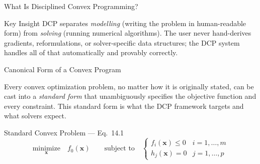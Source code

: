 \documentclass[aspectratio=169,10pt]{beamer}
\begin{document}
\begin{frame}[allowframebreaks]{What Is Disciplined Convex Programming?}
  \begin{alertblock}{Key Insight}
    DCP separates \emph{modelling} (writing the problem in human-readable
    form) from \emph{solving} (running numerical algorithms).  The user
    never hand-derives gradients, reformulations, or solver-specific
    data structures; the DCP system handles all of that automatically and
    provably correctly.
  \end{alertblock}

\end{frame}

\begin{frame}[allowframebreaks]{Canonical Form of a Convex Program}

  Every convex optimization problem, no matter how it is originally
  stated, can be cast into a \emph{standard form} that unambiguously
  specifies the objective function and every constraint.  This standard
  form is what the DCP framework targets and what solvers expect.

  \begin{block}{Standard Convex Problem --- Eq.\ 14.1}
    \[
      \underset{\mathbf{x}}{\mathrm{minimize}}\quad f_0(\mathbf{x})
      \qquad
      \text{subject to}\quad
      \begin{cases}
        f_i(\mathbf{x}) \leq 0 & i = 1,\ldots,m\\[4pt]
        h_j(\mathbf{x}) = 0    & j = 1,\ldots,p
      \end{cases}
    \]
  \end{block}


\end{frame}
\end{document}
